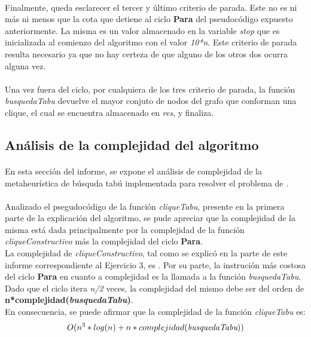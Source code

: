 \paragraph{}
Finalmente, queda esclarecer el tercer y último criterio de parada. Este no es ni más ni menos que la cota que detiene al ciclo \textbf{Para} del pseudocódigo expuesto anteriormente. La misma es un valor almacenado en la variable \textit{stop} que es inicializada al comienzo del algoritmo con el valor \textit{10*n}. Este criterio de parada resulta necesario ya que no hay certeza de que alguno de los otros dos ocurra alguna vez.
 
\paragraph{}
Una vez fuera del ciclo, por cualquiera de los tres criterio de parada, la función \textit{busquedaTabu} devuelve el mayor conjuto de nodos del grafo que conforman una clique, el cual se encuentra almacenado en \textit{res}, y finaliza.

\subsection{Análisis de la complejidad del algoritmo}

\paragraph{}
En esta sección del informe, se expone el análisis de complejidad de la metaheurística de búsquda tabú implementada para resolver el problema de \mc.

\paragraph{}
Analizado el psegudocódigo de la función \textit{cliqueTabu}, presente en la primera parte de la explicación del algoritmo, se pude apreciar que la complejidad de la misma está dada principalmente por la complejidad de la función \textit{cliqueConstructivo} más la complejidad del ciclo \textbf{Para}. \\
La complejidad de \textit{cliqueConstructivo}, tal como se explicó en la parte de este informe correspondiente al Ejercicio 3, es . Por su parte, la instrución más costosa del ciclo \textbf{Para} en cuanto a complejidad es la llamada a la función \textit{busquedaTabu}. Dado que el ciclo itera \textit{n/2} veces, la complejidad del mismo debe ser del orden de \textbf{n*complejidad(\textit{busquedaTabu})}. \\
En consecuencia, se puede afirmar que la complejidad de la función \textit{cliqueTabu} es: $$O(n^3*log(n) + n*complejidad(\textit{busquedaTabu}))$$


